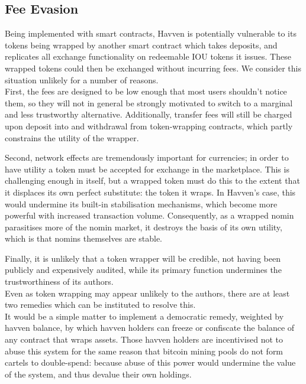 \newpage

\subsection{Fee Evasion}

\noindent Being implemented with smart contracts, Havven is potentially
vulnerable to its tokens being wrapped by another smart contract which takes
deposits, and replicates all exchange functionality on redeemable IOU tokens
it issues. These wrapped tokens could then be exchanged without incurring fees.
We consider this situation unlikely for a number of reasons. \\

\noindent First, the fees are designed to be low enough that most users
shouldn't notice them, so they will not in general be strongly motivated to
switch to a marginal and less trustworthy alternative. Additionally, transfer
fees will still be charged upon deposit into and withdrawal from
token-wrapping contracts, which partly constrains the utility of the wrapper.

\noindent Second, network effects are tremendously important for currencies;
in order to have utility a token must be accepted for exchange in the
marketplace. This is challenging enough in itself, but a wrapped token must
do this to the extent that it displaces its own perfect substitute: the token
it wraps.
In Havven's case, this would undermine its built-in
stabilisation mechanisms, which become more powerful with increased
transaction volume. Consequently, as a wrapped nomin parasitises more of the
nomin market, it destroys the basis of its own utility, which is that nomins
themselves are stable.

\noindent Finally, it is unlikely that a token wrapper will be credible, not
having been publicly and expensively audited, while its primary function
undermines the trustworthiness of its authors. \\

\noindent Even as token wrapping may appear unlikely to the authors, there
are at least two remedies which can be instituted to resolve this. \\

\noindent It would be a simple matter to implement a democratic remedy,
weighted by havven balance, by which havven holders can freeze or confiscate the
balance of any contract that wraps assets. Those havven holders are
incentivised not to abuse this system for the same reason that bitcoin
mining pools do not form cartels to double-spend: because abuse of this
power would undermine the value of the system, and thus devalue their
own holdings.

